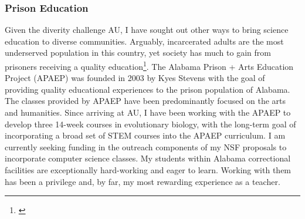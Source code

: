 \subsubsection*{Prison Education}
Given the diverity challenge AU,
I have sought out other ways to bring science education to diverse communities.
Arguably, incarcerated adults are the most underserved population in this country,
yet society has much to gain from prisoners receiving a quality
education\footnote{\label{Vacca04}}.
The Alabama Prison + Arts Education Project (APAEP) was founded in 2003 by Kyes
Stevens with the goal of providing quality
educational experiences to the prison population of Alabama.
The classes provided by APAEP have been predominantly focused on the
arts and humanities.
Since arriving at AU, I have been working with the APAEP to develop three
14-week courses in evolutionary biology, with the long-term goal of
incorporating a broad set of STEM courses into the APAEP curriculum.
I am currently seeking funding in the outreach components of my NSF proposals
to incorporate computer science classes.
My students within Alabama correctional facilities are exceptionally
hard-working and eager to learn.
Working with them has been a privilege and, by far, my most rewarding
experience as a teacher.
